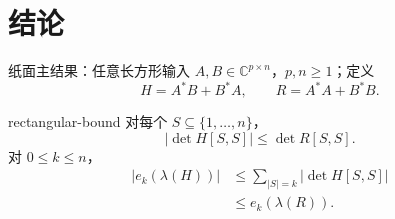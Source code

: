 \documentclass{beamer}
\begin{document}
\section{结论}
\begin{frame}{纸面主结果：任意长方形输入}
$A,B\in\mathbb C^{p\times n}$，$p,n\geq1$；定义
\[
H=A^*B+B^*A,\qquad R=A^*A+B^*B.
\]
\begin{bookresult}{rectangular-bound}
对每个 $S\subseteq\{1,\ldots,n\}$，
\[
|\det H[S,S]|\leq\det R[S,S].
\]
对 $0\leq k\leq n$，
\begin{align*}
|e_k(\lambda(H))|&\leq\sum_{|S|=k}|\det H[S,S]|\\
&\leq e_k(\lambda(R)).
\end{align*}
\end{bookresult}
\end{frame}
\end{document}
